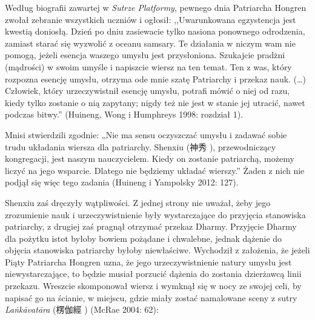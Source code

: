 Według biografii zawartej w \textit{Sutrze Platformy}, pewnego dnia Patriarcha Hongren zwołał zebranie wszystkich uczniów i ogłosił: ,,Uwarunkowana egzystencja jest kwestią doniosłą. Dzień po dniu zasiewacie tylko nasiona ponownego odrodzenia, zamiast starać się wyzwolić z oceanu samsary\fnm. Te działania w niczym wam nie pomogą, jeżeli esencja waszego umysłu jest przysłoniona. Szukajcie pradżni (mądrości) w swoim umyśle i napiszcie wiersz na ten temat. Ten z was, który rozpozna esencję umysłu, otrzyma ode mnie szatę Patriarchy i przekaz nauk. (\ldots) Człowiek, który urzeczywistnił esencję umysłu, potrafi mówić o niej od razu, kiedy tylko zostanie o nią zapytany; nigdy też nie jest w stanie jej utracić, nawet podczas bitwy.'' (Huineng, Wong i Humphreys 1998: rozdział 1).

Mnisi stwierdzili zgodnie: „Nie ma sensu oczyszczać umysłu i zadawać sobie trudu układania wiersza dla patriarchy. Shenxiu (神秀 ), przewodniczący kongregacji, jest naszym nauczycielem. Kiedy on zostanie patriarchą, możemy liczyć na jego wsparcie. Dlatego nie będziemy układać wierszy.” Żaden z nich nie podjął się więc tego zadania (Huineng i Yampolsky 2012: 127).

Shenxiu zaś dręczyły wątpliwości. Z jednej strony nie uważał, żeby jego zrozumienie nauk i urzeczywistnienie były wystarczające do przyjęcia stanowiska patriarchy, z drugiej zaś pragnął otrzymać przekaz Dharmy. Przyjęcie Dharmy dla pożytku istot byłoby bowiem pożądane i chwalebne, jednak dążenie do objęcia stanowiska patriarchy byłoby niewłaściwe. Wychodził z założenia, że jeżeli Piąty Patriarcha Hongren uzna, że jego urzeczywistnienie natury umysłu jest niewystarczające, to będzie musiał porzucić dążenia do zostania dzierżawcą linii przekazu. Wreszcie skomponował wiersz i wymknął się w nocy ze swojej celi, by napisać go na ścianie, w miejscu, gdzie miały zostać namalowane sceny z sutry \textit{Laṅkāvatāra} (楞伽經 ) (McRae 2004: 62):

